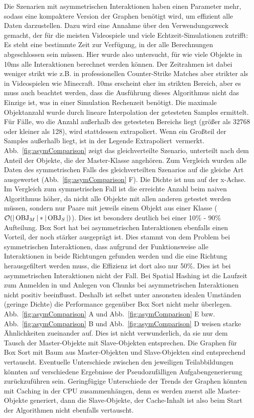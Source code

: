 Die Szenarien mit asymmetrischen Interaktionen haben einen Parameter mehr, sodass eine kompaktere Version der Graphen benötigt wird, um effizient alle Daten darzustellen. Dazu wird eine Annahme über den Verwendungszweck gemacht, der für die meisten Videospiele und viele Echtzeit-Simulationen zutrifft: Es steht eine bestimmte Zeit zur Verfügung, in der alle Berechnungen abgeschlossen sein müssen. Hier wurde also untersucht, für wie viele Objekte in 10ms alle Interaktionen berechnet werden können. Der Zeitrahmen ist dabei weniger strikt wie z.B. in professionellen Counter-Strike Matches aber strikter als in Videospielen wie Minecraft. 10ms erscheint eher im strikten Bereich, aber es muss auch beachtet werden, dass die Ausführung dieses Algorithmus nicht das Einzige ist, was in einer Simulation Rechenzeit benötigt. Die maximale Objektanzahl wurde durch lineare Interpolation der getesteten Samples ermittelt. Für Fälle, wo die Anzahl außerhalb des getesteten Bereichs liegt (größer als 32768 oder kleiner als 128), wird stattdessen extrapoliert. Wenn ein Großteil der Samples außerhalb liegt, ist in der Legende \glqq Extrapoliert\grqq ~vermerkt.\\
Abb.~\ref{fig:asymComparison} zeigt das gleichverteilte Szenario, unterteilt nach dem Anteil der Objekte, die der Master-Klasse angehören. Zum Vergleich wurden alle Daten des symmetrischen Falls des gleichverteilten Szenarios auf die gleiche Art ausgewertet (Abb.~\ref{fig:asymComparison} F). Die Dichte ist nun auf der x-Achse. Im Vergleich zum symmetrischen Fall ist die erreichte Anzahl beim naiven Algorithmus höher, da nicht alle Objekte mit allen anderen getestet werden müssen, sondern nur Paare mit jeweils einem Objekt aus einer Klasse ($\mathcal{O}(|\operatorname{OBJ}_M|*|\operatorname{OBJ}_S|)$). Dies ist besonders deutlich bei einer 10\% - 90\% Aufteilung. Box Sort hat bei asymmetrischen Interaktionen ebenfalls einen Vorteil, der noch stärker ausgeprägt ist. Dies stammt von dem Problem bei symmetrischen Interaktionen, dass aufgrund der Funktionsweise alle Interaktionen in beide Richtungen gefunden werden und die eine Richtung herausgefiltert werden muss, die Effizienz ist dort also nur 50\%. Dies ist bei asymmetrischen Interaktionen nicht der Fall. Bei Spatial Hashing ist die Laufzeit zum Anmelden in und Anlegen von Chunks bei asymmetrischen Interaktionen nicht positiv beeinflusst. Deshalb ist selbst unter ansonsten idealen Umständen (geringe Dichte) die Performance gegenüber Box Sort nicht mehr überlegen.\\
Abb.~\ref{fig:asymComparison} A und Abb.~\ref{fig:asymComparison} E bzw. Abb.~\ref{fig:asymComparison} B und Abb.~\ref{fig:asymComparison} D weisen starke Ähnlichkeiten zueinander auf. Dies ist nicht verwunderlich, da sie nur dem Tausch der Master-Objekte mit Slave-Objekten entsprechen. Die Graphen für Box Sort mit Baum aus Master-Objekten und Slave-Objekten sind entsprechend vertauscht. Eventuelle Unterschiede zwischen den jeweiligen Teilabbildungen könnten auf verschiedene Ergebnisse der Pseudozufälligen Aufgabengenerierung zurückzuführen sein. Geringfügige Unterschiede der Trends der Graphen könnten mit Caching in der CPU zusammenhängen, denn es werden zuerst alle Master-Objekte generiert, dann die Slave-Objekte, der Cache-Inhalt ist also beim Start der Algorithmen nicht ebenfalls vertauscht.\\

